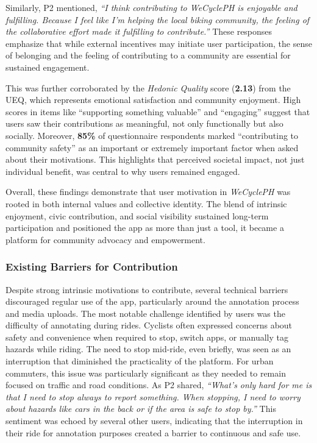 Similarly, P2 mentioned, \textit{``I think contributing to WeCyclePH is enjoyable and fulfilling. Because I feel like I'm helping the local biking community, the feeling of the collaborative effort made it fulfilling to contribute.''} These responses emphasize that while external incentives may initiate user participation, the sense of belonging and the feeling of contributing to a community are essential for sustained engagement.

This was further corroborated by the \textit{Hedonic Quality} score (\textbf{2.13}) from the UEQ, which represents emotional satisfaction and community enjoyment. High scores in items like ``supporting something valuable'' and ``engaging'' suggest that users saw their contributions as meaningful, not only functionally but also socially. Moreover, \textbf{85\%} of questionnaire respondents marked ``contributing to community safety'' as an important or extremely important factor when asked about their motivations. This highlights that perceived societal impact, not just individual benefit, was central to why users remained engaged.

Overall, these findings demonstrate that user motivation in \textit{WeCyclePH} was rooted in both internal values and collective identity. The blend of intrinsic enjoyment, civic contribution, and social visibility sustained long-term participation and positioned the app as more than just a tool, it became a platform for community advocacy and empowerment.

\subsubsection{Existing Barriers for Contribution}

Despite strong intrinsic motivations to contribute, several technical barriers discouraged regular use of the app, particularly around the annotation process and media uploads. The most notable challenge identified by users was the difficulty of annotating during rides. Cyclists often expressed concerns about safety and convenience when required to stop, switch apps, or manually tag hazards while riding. The need to stop mid-ride, even briefly, was seen as an interruption that diminished the practicality of the platform. For urban commuters, this issue was particularly significant as they needed to remain focused on traffic and road conditions. As P2 shared, \textit{``What's only hard for me is that I need to stop always to report something. When stopping, I need to worry about hazards like cars in the back or if the area is safe to stop by.''} This sentiment was echoed by several other users, indicating that the interruption in their ride for annotation purposes created a barrier to continuous and safe use.

